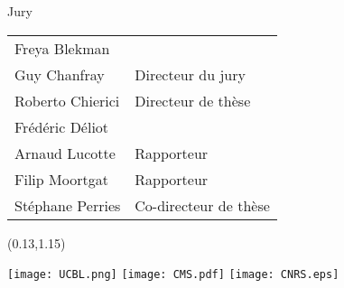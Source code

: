 \begin{titlepage}
\begin{center} \small
Jury \\
\begin{tabular}{L{5cm}l}
Freya Blekman & \\
Guy Chanfray & Directeur du jury \\
Roberto Chierici & Directeur de thèse \\
Frédéric Déliot & \\
Arnaud Lucotte & Rapporteur \\
Filip Moortgat & Rapporteur \\
Stéphane Perries & Co-directeur de thèse
\end{tabular}

\end{center}

\vfill

\begin{textblock}{1}(0.13,1.15)
\begin{center}
\texttt{[image: UCBL.png]} \hspace{1cm}  \hspace{1cm} \texttt{[image: CMS.pdf]} \hspace{1cm} \texttt{[image: CNRS.eps]}
\end{center}
\end{textblock}

\end{titlepage}